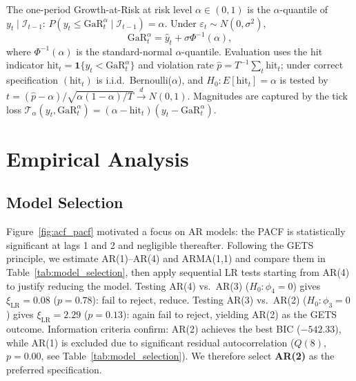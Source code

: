 \documentclass[12pt]{article}
\begin{document}
The one-period Growth-at-Risk at risk level $\alpha\in(0,1)$ is the $\alpha$-quantile of $y_t\mid\mathcal{I}_{t-1}$: $P(y_t \leq \mathrm{GaR}^\alpha_t \mid \mathcal{I}_{t-1}) = \alpha$. Under $\varepsilon_t \sim N(0,\sigma^2)$,
\begin{equation}\label{eq:gar}
  \mathrm{GaR}^\alpha_t = \hat{y}_t + \sigma\Phi^{-1}(\alpha),
\end{equation}
where $\Phi^{-1}(\alpha)$ is the standard-normal $\alpha$-quantile.
\newline
Evaluation uses the hit indicator $\mathrm{hit}_t = \mathbf{1}\{y_t < \mathrm{GaR}^\alpha_t\}$ and violation rate $\hat{p} = T^{-1}\sum_t \mathrm{hit}_t$; under correct specification $(\mathrm{hit}_t)$ is i.i.d.\ Bernoulli($\alpha$), and $H_0\colon E[\mathrm{hit}_t]=\alpha$ is tested by $t = (\hat{p}-\alpha)/\sqrt{\alpha(1-\alpha)/T} \xrightarrow{d} N(0,1)$. Magnitudes are captured by the tick loss $\mathcal{T}_\alpha(y_t, \mathrm{GaR}^\alpha_t) = (\alpha - \mathrm{hit}_t)(y_t - \mathrm{GaR}^\alpha_t)$.


\section{Empirical Analysis}\label{sec:p1-empirical}

\subsection{Model Selection}

Figure~\ref{fig:acf_pacf} motivated a focus on AR models: the PACF is statistically significant at lags 1 and 2 and negligible thereafter. Following the GETS principle, we estimate AR(1)--AR(4) and ARMA(1,1) and compare them in Table~\ref{tab:model_selection}, then apply sequential LR tests starting from AR(4) to justify reducing the model.
\newline
\newline
Testing AR(4) vs.\ AR(3) ($H_0\colon \phi_4=0$) gives $\xi_{\mathrm{LR}}=0.08$ ($p=0.78$): fail to reject, reduce. Testing AR(3) vs.\ AR(2) ($H_0\colon \phi_3=0$) gives $\xi_{\mathrm{LR}}=2.29$ ($p=0.13$): again fail to reject, yielding AR(2) as the GETS outcome. Information criteria confirm: AR(2) achieves the best BIC ($-542.33$), while AR(1) is excluded due to significant residual autocorrelation ($Q(8)$, $p=0.00$, see Table~\ref{tab:model_selection}). We therefore select \textbf{AR(2)} as the preferred specification.
\end{document}
